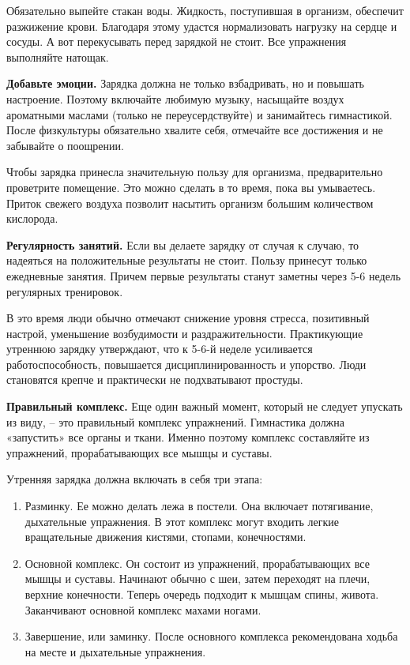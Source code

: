Обязательно выпейте стакан воды. Жидкость, поступившая в организм, обеспечит разжижение крови. Благодаря этому удастся нормализовать нагрузку на сердце и сосуды. А вот перекусывать перед зарядкой не стоит. Все упражнения выполняйте натощак.

\textbf{Добавьте эмоции.} Зарядка должна не только взбадривать, но и повышать настроение. Поэтому включайте любимую музыку, насыщайте воздух ароматными маслами (только не переусердствуйте) и занимайтесь гимнастикой. После физкультуры обязательно хвалите себя, отмечайте все достижения и не забывайте о поощрении.

Чтобы зарядка принесла значительную пользу для организма, предварительно проветрите помещение. Это можно сделать в то время, пока вы умываетесь. Приток свежего воздуха позволит насытить организм большим количеством кислорода.

\textbf{Регулярность занятий.} Если вы делаете зарядку от случая к случаю, то надеяться на положительные результаты не стоит. Пользу принесут только ежедневные занятия. Причем первые результаты станут заметны через 5-6 недель регулярных тренировок.

В это время люди обычно отмечают снижение уровня стресса, позитивный настрой, уменьшение возбудимости и раздражительности. Практикующие утреннюю зарядку утверждают, что к 5-6-й неделе усиливается работоспособность, повышается дисциплинированность и упорство. Люди становятся крепче и практически не подхватывают простуды.

\textbf{Правильный комплекс.} Еще один важный момент, который не следует упускать из виду, – это правильный комплекс упражнений. Гимнастика должна «запустить» все органы и ткани. Именно поэтому комплекс составляйте из упражнений, прорабатывающих все мышцы и суставы.



Утренняя зарядка должна включать в себя три этапа:
\begin{enumerate}
    \item Разминку. Ее можно делать лежа в постели. Она включает потягивание, дыхательные упражнения. В этот комплекс могут входить легкие вращательные движения кистями, стопами, конечностями.
    \item Основной комплекс. Он состоит из упражнений, прорабатывающих все мышцы и суставы. Начинают обычно с шеи, затем переходят на плечи, верхние конечности. Теперь очередь подходит к мышцам спины, живота. Заканчивают основной комплекс махами ногами.
    \item Завершение, или заминку. После основного комплекса рекомендована ходьба на месте и дыхательные упражнения.
\end{enumerate}




